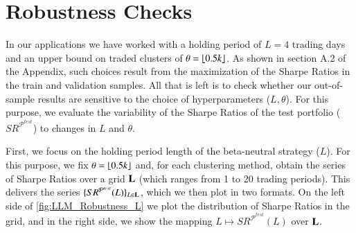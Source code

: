 
\section{Robustness Checks}

In our applications we have worked with a holding period of $L=4$ trading days and an upper bound on traded clusters of $\theta=\lfloor 0.5k \rfloor$. As shown in section A.2 of the Appendix, such choices result from the maximization of the Sharpe Ratios in the train and validation samples. All that is left is to check whether our out-of-sample results are sensitive to the choice of hyperparameters ($L,\theta$). For this purpose, we evaluate the variability of the Sharpe Ratios of the test portfolio ($SR^{\mathcal P^{test}}$) to changes in $L$ and $\theta$. 

\bx 
First, we focus on the holding period length of the beta-neutral strategy ($L$). For this purpose, we fix $\theta=\lfloor 0.5k \rfloor$ and, for each clustering method, obtain the series of Sharpe Ratios over a grid $\mathbf L$ (which ranges from 1 to 20 trading periods). This delivers the series $\{SR^{\mathcal P ^{test}} (L)\}_{L\in\mathbf L}$, which we then plot in two formats. On the left side of \cref{fig:LLM_Robustness_L} we plot the distribution of Sharpe Ratios in the grid, and in the right side, we show the mapping $L\mapsto SR^{\mathcal P ^{test}} (L)$ over $\mathbf L$. 

